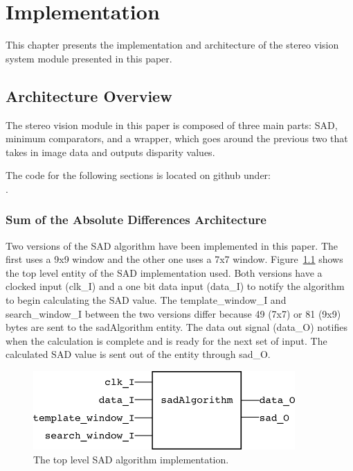 \chapter{Implementation}
\label{sec:impl}

This chapter presents the implementation and architecture of the stereo vision system module presented in this paper.

\section{Architecture Overview}

The stereo vision module in this paper is composed of three main parts: SAD, minimum comparators, and a wrapper, which goes around the previous two that takes in image data and outputs disparity values.

The code for the following sections is located on github under:
\\.

\subsection{Sum of the Absolute Differences Architecture}

Two versions of the SAD algorithm have been implemented in this paper. The first uses a 9x9 window and the other one uses a 7x7 window. Figure~\ref{fig:sadAlg_rtl} shows the top level entity of the SAD implementation used. Both versions have a clocked input (clk\_I) and a one bit data input (data\_I) to notify the algorithm to begin calculating the SAD value. The template\_window\_I and search\_window\_I between the two versions differ because 49 (7x7) or 81 (9x9) bytes are sent to the sadAlgorithm entity. The data out signal (data\_O) notifies when the calculation is complete and is ready for the next set of input. The calculated SAD value is sent out of the entity through sad\_O.

\begin{figure}
	\begin{center}
		\includegraphics[width=100mm]{figures/sadAlgorithm_rtl.png}
		\captionfonts
		\caption{The top level SAD algorithm implementation.}
		\label{fig:sadAlg_rtl}
	\end{center}
\end{figure}

